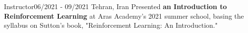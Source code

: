 \resumeSubheadingReza
{Instructor}{06/2021 - 09/2021}
{}{Tehran, Iran}
{Presented \textbf{an Introduction to Reinforcement Learning} at Aras Academy's 2021 summer school, basing the syllabus on Sutton's book, "Reinforcement Learning: An Introduction."}
